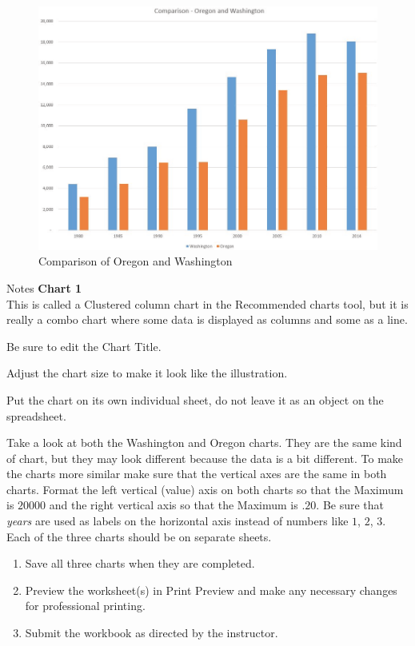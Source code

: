 
\begin{figure}[H]
	\centering
	\includegraphics[width=\maxwidth{.95\linewidth}]{gfx/ch04_fig56}
	\caption{Comparison of Oregon and Washington}
	\label{04:fig56}
\end{figure}

\begin{center}
	\begin{infobox}{Notes}
		\textbf{Chart 1}
		\\
		This is called a Clustered column chart in the Recommended charts tool, but it is really a combo chart where some data is displayed as columns and some as a line.
		
		Be sure to edit the Chart Title.
		
		Adjust the chart size to make it look like the illustration.
		
		Put the chart on its own individual sheet, do not leave it as an object on the spreadsheet.
	\end{infobox}
\end{center}

Take a look at both the Washington and Oregon charts. They are the same kind of chart, but they may look different because the data is a bit different. To make the charts more similar make sure that the vertical axes are the same in both charts. Format the left vertical (value) axis on both charts so that the Maximum is $ 20000 $ and the right vertical axis so that the Maximum is $ .20 $. Be sure that \textit{years} are used as labels on the horizontal axis instead of numbers like $ 1 $, $ 2 $, $ 3 $. Each of the three charts should be on separate sheets.

\begin{enumerate}
	\item Save all three charts when they are completed. 
	\item Preview the worksheet(s) in Print Preview and make any necessary changes for professional printing.
	\item Submit the  workbook as directed by the instructor.
\end{enumerate}